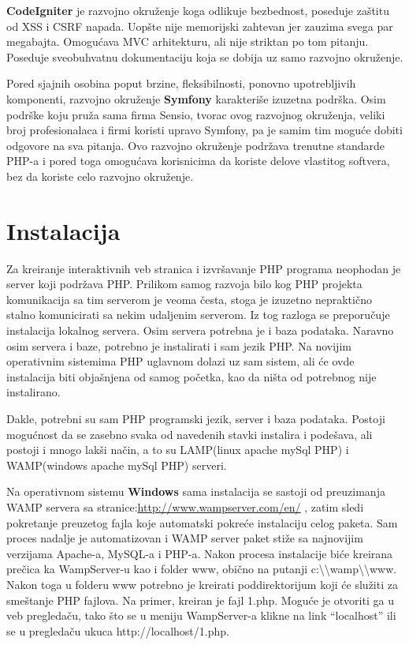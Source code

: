 \documentclass[a4paper]{article}
\begin{document}
{\textbf{CodeIgniter} je razvojno okruženje koga odlikuje bezbednost, poseduje zaštitu od XSS i CSRF napada. Uopšte nije memorijski zahtevan jer zauzima svega par megabajta. Omogućava MVC arhitekturu, ali nije striktan po tom pitanju. Poseduje sveobuhvatnu dokumentaciju koja se dobija uz samo razvojno okruženje.

Pored sjajnih osobina poput brzine, fleksibilnosti, ponovno upotrebljivih komponenti, razvojno okruženje \textbf{Symfony} karakteriše izuzetna podrška. Osim podrške koju pruža sama firma Sensio, tvorac ovog razvojnog okruženja, veliki broj profesionalaca i firmi koristi upravo Symfony, pa je samim tim moguće dobiti odgovore na sva pitanja. Ovo razvojno okruženje podržava trenutne standarde PHP-a i pored toga omogućava korisnicima da koriste delove vlastitog softvera, bez da koriste celo razvojno okruženje.

\section{Instalacija}
Za kreiranje interaktivnih veb stranica i izvršavanje PHP programa neophodan je server koji podržava PHP. Prilikom samog razvoja bilo kog PHP projekta komunikacija sa tim serverom je veoma česta, stoga je izuzetno nepraktično stalno komunicirati sa nekim udaljenim serverom. Iz tog razloga se preporučuje instalacija lokalnog servera. Osim servera potrebna je i baza podataka. Naravno osim servera i baze, potrebno je instalirati i sam jezik PHP. Na novijim operativnim sistemima PHP uglavnom dolazi uz sam sistem, ali će ovde instalacija biti objašnjena od samog početka, kao da ništa od potrebnog nije instalirano.

Dakle, potrebni su sam PHP programski jezik, server i baza podataka. Postoji mogućnost da se zasebno svaka od navedenih stavki instalira i podešava, ali postoji i mnogo lakši način, a to su LAMP(linux apache mySql PHP) \cite{lamp} i WAMP(windows apache mySql PHP) \cite{wamp} serveri. 

Na operativnom sistemu \textbf{Windows} sama instalacija se sastoji od preuzimanja WAMP servera sa stranice:\url{http://www.wampserver.com/en/} , zatim sledi pokretanje preuzetog fajla koje automatski pokreće instalaciju celog paketa. Sam proces nadalje je automatizovan i WAMP server paket stiže sa najnovijim verzijama Apache-a, MySQL-a i PHP-a. Nakon procesa instalacije biće kreirana prečica ka WampServer-u kao i  folder www, obično na putanji c:\textbackslash \textbackslash wamp\textbackslash \textbackslash www. Nakon toga u folderu www potrebno je kreirati poddirektorijum koji će služiti za smeštanje PHP fajlova. Na primer, kreiran je fajl 1.php. Moguće je otvoriti ga u veb pregledaču, tako što se u meniju WampServer-a klikne na link “localhost” ili se u pregledaču ukuca http://localhost/1.php.

}
\end{document}
